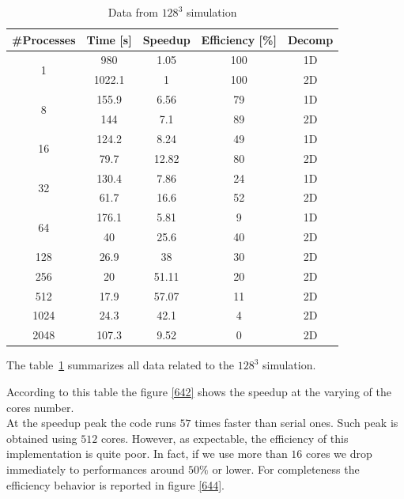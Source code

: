 \begin{table}[h]
\caption{Data from $128^{3}$ simulation}
\begin{center}
\begin{tabular}{c c c c c}
\toprule
\textbf{\#Processes} & \textbf{Time [s]} & \textbf{Speedup} & \textbf{Efficiency [\%]} & \textbf{Decomp}\\
\midrule
\multirow{2}{*}{1} & 980 & 1.05 & 100 & 1D\\
& 1022.1 & 1 & 100 & 2D \\
\hline
\multirow{2}{*}{8} & 155.9 & 6.56 & 79 & 1D\\
& 144 & 7.1 & 89 & 2D\\
\hline
\multirow{2}{*}{16} & 124.2 & 8.24 & 49 & 1D\\
& 79.7 & 12.82 & 80 & 2D\\
\hline
\multirow{2}{*}{32} & 130.4 & 7.86 & 24 & 1D\\
& 61.7 & 16.6 & 52 & 2D\\
\hline
\multirow{2}{*}{64} & 176.1 & 5.81 & 9 & 1D\\
& 40 & 25.6 & 40 & 2D\\
\hline
128 & 26.9 & 38 & 30 & 2D\\

256 & 20 & 51.11 & 20 & 2D\\

512 & 17.9 & 57.07 & 11 & 2D\\

1024 & 24.3 & 42.1 & 4 & 2D\\

2048 & 107.3 & 9.52 & 0 & 2D\\
\bottomrule
\end{tabular}
\end{center}
\label{64data}
\end{table}%


The table~\ref{64data} summarizes all data related to the $128^{3}$ simulation. 


\par
According to this table the figure \ref{642} shows the speedup at the varying of the cores number. \\
At the speedup peak the code runs $57$ times faster than serial ones. Such peak is obtained using $512$ cores. However, as expectable, the efficiency of this implementation is quite poor. In fact, if we use more than $16$ cores we drop immediately to performances around $50\%$ or lower. 
For completeness the efficiency behavior is reported in figure \ref{644}.

